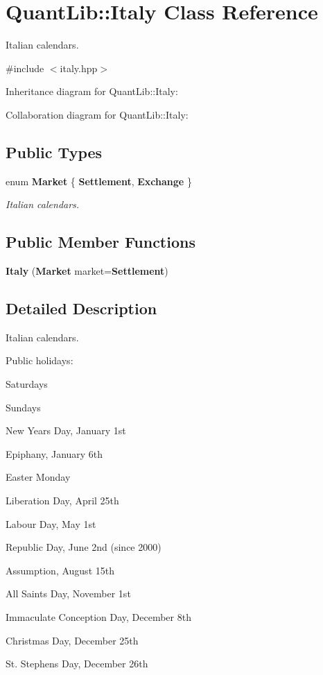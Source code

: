 \section{Quant\+Lib\+:\+:Italy Class Reference}
\label{class_quant_lib_1_1_italy}


Italian calendars.  




{\ttfamily \#include $<$italy.\+hpp$>$}



Inheritance diagram for Quant\+Lib\+:\+:Italy\+:


Collaboration diagram for Quant\+Lib\+:\+:Italy\+:
\subsection*{Public Types}
\begin{DoxyCompactItemize}
\item 
enum {\bf Market} \{ {\bf Settlement}, 
{\bf Exchange}
 \}\begin{DoxyCompactList}\small\item\em Italian calendars. \end{DoxyCompactList}
\end{DoxyCompactItemize}
\subsection*{Public Member Functions}
\begin{DoxyCompactItemize}
\item 
{\bf Italy} ({\bf Market} market={\bf Settlement})
\end{DoxyCompactItemize}


\subsection{Detailed Description}
Italian calendars. 

Public holidays\+: 
\begin{DoxyItemize}
\item Saturdays 
\item Sundays 
\item New Year\textquotesingle{}s Day, January 1st 
\item Epiphany, January 6th 
\item Easter Monday 
\item Liberation Day, April 25th 
\item Labour Day, May 1st 
\item Republic Day, June 2nd (since 2000) 
\item Assumption, August 15th 
\item All Saint\textquotesingle{}s Day, November 1st 
\item Immaculate Conception Day, December 8th 
\item Christmas Day, December 25th 
\item St. Stephen\textquotesingle{}s Day, December 26th 
\end{DoxyItemize}

